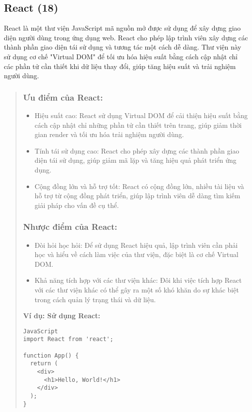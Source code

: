 \subsection{React (18)}
React là một thư viện JavaScript mã nguồn mở được sử dụng để xây dựng giao diện người dùng trong ứng dụng web. React cho phép lập trình viên xây dựng các thành phần giao diện tái sử dụng và tương tác một cách dễ dàng. Thư viện này sử dụng cơ chế "Virtual DOM" để tối ưu hóa hiệu suất bằng cách cập nhật chỉ các phần tử cần thiết khi dữ liệu thay đổi, giúp tăng hiệu suất và trải nghiệm người dùng.

\begin{quote}
\subsubsection{Ưu điểm của React:}
\begin{itemize}
  \item Hiệu suất cao: React sử dụng Virtual DOM để cải thiện hiệu suất bằng cách cập nhật chỉ những phần tử cần thiết trên trang, giúp giảm thời gian render và tối ưu hóa trải nghiệm người dùng.
  \item Tính tái sử dụng cao: React cho phép xây dựng các thành phần giao diện tái sử dụng, giúp giảm mã lặp và tăng hiệu quả phát triển ứng dụng.
  \item Cộng đồng lớn và hỗ trợ tốt: React có cộng đồng lớn, nhiều tài liệu và hỗ trợ từ cộng đồng phát triển, giúp lập trình viên dễ dàng tìm kiếm giải pháp cho vấn đề cụ thể.
\end{itemize}

\subsubsection{Nhược điểm của React:}
\begin{itemize}
  \item Đòi hỏi học hỏi: Để sử dụng React hiệu quả, lập trình viên cần phải học và hiểu về cách làm việc của thư viện, đặc biệt là cơ chế Virtual DOM.
  \item Khả năng tích hợp với các thư viện khác: Đôi khi việc tích hợp React với các thư viện khác có thể gây ra một số khó khăn do sự khác biệt trong cách quản lý trạng thái và dữ liệu.
\end{itemize}

\textbf{Ví dụ: Sử dụng React:}
\begin{lstlisting}
JavaScript
import React from 'react';

function App() {
  return (
    <div>
      <h1>Hello, World!</h1>
    </div>
  );
}
\end{lstlisting}
\end{quote}


